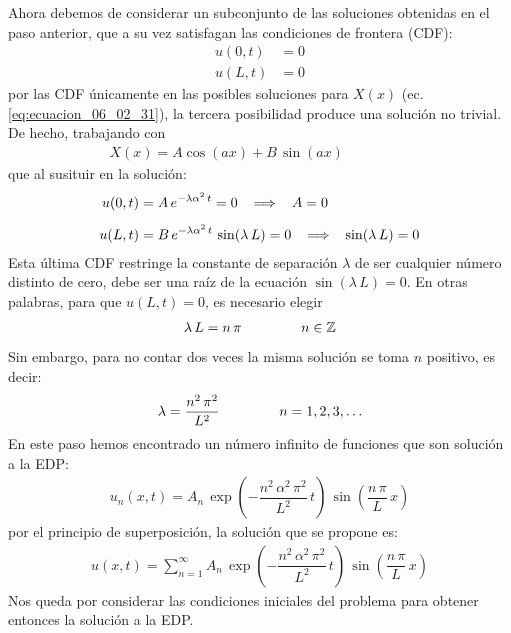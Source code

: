 Ahora debemos de considerar un subconjunto de las soluciones obtenidas en el paso anterior, que a su vez satisfagan las condiciones de frontera (CDF):
\begin{align*}
u(0, t) &= 0 \\[0.5em]
u(L, t) &= 0
\end{align*}
por las CDF únicamente en las posibles soluciones para $X(x)$ (ec. \ref{eq:ecuacion_06_02_31}), la tercera posibilidad produce una solución no trivial. De hecho, trabajando con
\begin{align*}
X(x) = A \cos (a x) + B \, \sin (a x) \hspace{2cm}
\end{align*}
que al susituir en la solución:
\begin{align*}
u(0, t) &= A \, e^{-\lambda \alpha^{2} \, t} = 0 \hspace{0.3cm} \Longrightarrow \hspace{0.3cm} A = 0 \\[0.5em]
u(L, t) &= B \, e^{-\lambda \alpha^{2} \, t} \, \sin (\lambda \, L) = 0 \hspace{0.3cm} \Longrightarrow \hspace{0.3cm} \sin (\lambda \, L) = 0
\end{align*}
Esta última CDF restringe la constante de separación $\lambda$ de ser cualquier número distinto de cero, debe ser una raíz de la ecuación $\sin (\lambda \, L) = 0$. En otras palabras, para que $u(L, t) = 0$, es necesario elegir
\begin{align}
\lambda \, L = n \, \pi \hspace{1.5cm} n \in \mathbb{Z}
\label{eq:ecuacion_06_02_34}    
\end{align}
Sin embargo, para no contar dos veces la misma solución se toma $n$ positivo, es decir:
\begin{align}
\lambda = \dfrac{n^{2} \, \pi^{2}}{L^{2}} \hspace{1.5cm} n = 1, 2, 3, \ldots
\label{eq:ecuacion_06_02_35}
\end{align}
En este paso hemos encontrado un número infinito de funciones que son solución a la EDP:
\begin{align}
u_{n} (x, t) = A_{n} \, \exp \left( - \dfrac{n^{2} \, \alpha^{2} \, \pi^{2}}{L^{2}} \, t \right) \, \sin \left( \dfrac{n \, \pi}{L} \, x \right)
\label{eq:ecuacion_06_02_37}    
\end{align}
por el principio de superposición, la solución que se propone es:
\begin{align}
u (x, t) = \sum_{n=1}^{\infty} A_{n} \, \exp \left( - \dfrac{n^{2} \, \alpha^{2} \, \pi^{2}}{L^{2}} \, t \right) \, \sin \left( \dfrac{n \, \pi}{L} \, x \right)
\label{eq:ecuacion_06_02_38}
\end{align}
Nos queda por considerar las condiciones iniciales del problema para obtener entonces la solución a la EDP.

